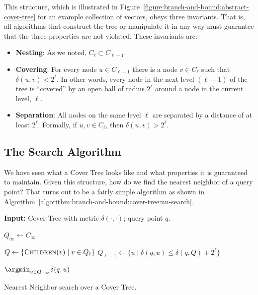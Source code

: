 This structure, which is illustrated in Figure~\ref{figure:branch-and-bound:abstract-cover-tree}
for an example collection of vectors, obeys three invariants. That is, all algorithms
that construct the tree or manipulate it in any way must guarantee
that the three properties are not violated. These invariants are:
\begin{itemize}
    \item \textbf{Nesting}: As we noted, $C_\ell \subset C_{\ell - 1}$.
    \item \textbf{Covering}: For every node $u \in C_{\ell - 1}$
    there is a node $v \in C_\ell$ such that $\delta(u, v) < 2^\ell$.
    In other words, every node in the next level $(\ell - 1)$ of the tree is ``covered''
    by an open ball of radius $2^\ell$ around a node in the current level, $\ell$.
    \item \textbf{Separation}: All nodes on the same level $\ell$ are separated by
    a distance of at least $2^\ell$. Formally, if $u, v \in C_\ell$, then $\delta(u, v) > 2^\ell$.
\end{itemize}

\subsection{The Search Algorithm}
We have seen what a Cover Tree looks like and what properties it is guaranteed to maintain.
Given this structure, how do we find the nearest neighbor of a query point?
That turns out to be a fairly simple algorithm as shown in Algorithm~\ref{algorithm:branch-and-bound:cover-tree:nn-search}.

\begin{algorithm}[!t]
\SetAlgoLined
{\bf Input: }{Cover Tree with metric $\delta(\cdot, \cdot)$; query point $q$.}\\

\begin{algorithmic}[1]

\STATE $Q_\infty \leftarrow C_\infty$ 

 \label{algorithm:branch-and-bound:cover-tree:nn-search:loop}
    \STATE $Q \leftarrow \{ \textsc{Children}(v) \;|\; v \in Q_\ell \}$ 
    \STATE $Q_{\ell - 1} \leftarrow \{ u \;|\; \delta(q, u) \leq \delta(q, Q) + 2^\ell \}$ \label{algorithm:branch-and-bound:cover-tree:nn-search:pruning}
\ENDFOR

\RETURN $\argmin_{u \in Q_{-\infty}} \delta(q, u)$ \label{algorithm:branch-and-bound:cover-tree:nn-search:return}
\end{algorithmic}
\caption{Nearest Neighbor search over a Cover Tree.}
\label{algorithm:branch-and-bound:cover-tree:nn-search}
\end{algorithm}

